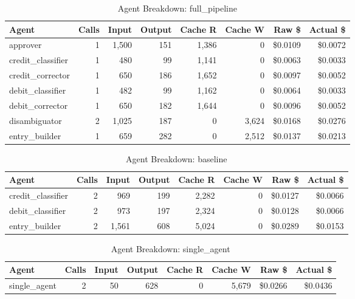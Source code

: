 \begin{table}[htbp]
\centering
\caption{Agent Breakdown: full\_pipeline}
\label{tab:agent-full-pipeline}
\begin{tabular}{l r rr rr rr}
\toprule
Agent & Calls & Input & Output & Cache R & Cache W & Raw \$ & Actual \$ \\
\midrule
  approver & 1 & 1,500 & 151 & 1,386 & 0 & \$0.0109 & \$0.0072 \\
  credit\_classifier & 1 & 480 & 99 & 1,141 & 0 & \$0.0063 & \$0.0033 \\
  credit\_corrector & 1 & 650 & 186 & 1,652 & 0 & \$0.0097 & \$0.0052 \\
  debit\_classifier & 1 & 482 & 99 & 1,162 & 0 & \$0.0064 & \$0.0033 \\
  debit\_corrector & 1 & 650 & 182 & 1,644 & 0 & \$0.0096 & \$0.0052 \\
  disambiguator & 2 & 1,025 & 187 & 0 & 3,624 & \$0.0168 & \$0.0276 \\
  entry\_builder & 1 & 659 & 282 & 0 & 2,512 & \$0.0137 & \$0.0213 \\
\bottomrule
\end{tabular}
\end{table}

\begin{table}[htbp]
\centering
\caption{Agent Breakdown: baseline}
\label{tab:agent-baseline}
\begin{tabular}{l r rr rr rr}
\toprule
Agent & Calls & Input & Output & Cache R & Cache W & Raw \$ & Actual \$ \\
\midrule
  credit\_classifier & 2 & 969 & 199 & 2,282 & 0 & \$0.0127 & \$0.0066 \\
  debit\_classifier & 2 & 973 & 197 & 2,324 & 0 & \$0.0128 & \$0.0066 \\
  entry\_builder & 2 & 1,561 & 608 & 5,024 & 0 & \$0.0289 & \$0.0153 \\
\bottomrule
\end{tabular}
\end{table}

\begin{table}[htbp]
\centering
\caption{Agent Breakdown: single\_agent}
\label{tab:agent-single-agent}
\begin{tabular}{l r rr rr rr}
\toprule
Agent & Calls & Input & Output & Cache R & Cache W & Raw \$ & Actual \$ \\
\midrule
  single\_agent & 2 & 50 & 628 & 0 & 5,679 & \$0.0266 & \$0.0436 \\
\bottomrule
\end{tabular}
\end{table}
